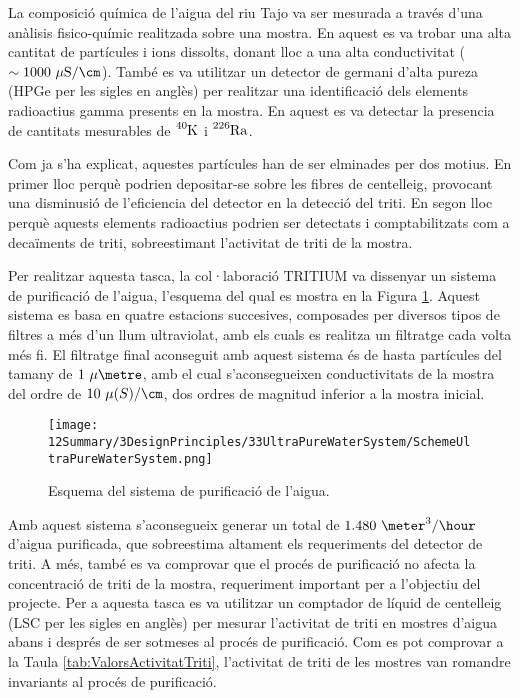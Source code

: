 La composició química de l'aigua del riu Tajo va ser mesurada a través d'una anàlisis fisico-químic realitzada sobre una mostra. En aquest es va trobar una alta cantitat de partícules i ions dissolts, donant lloc a una alta conductivitat ($\sim 1000~\mu\text{S}/\cm$). També es va utilitzar un detector de germani d'alta pureza (HPGe per les sigles en anglès) per realitzar una identificació dels elements radioactius gamma presents en la mostra. En aquest es va detectar la presencia de cantitats mesurables de $\ce{^{40}K}$ i $\ce{^{226}Ra}$.

Com ja s'ha explicat, aquestes partícules han de ser elminades per dos motius. En primer lloc perquè podrien depositar-se sobre les fibres de centelleig, provocant una disminusió de l'eficiencia del detector en la detecció del triti. En segon lloc perquè aquests elements radioactius podrien ser detectats i comptabilitzats com a decaïments de triti, sobreestimant l'activitat de triti de la mostra.

Per realitzar aquesta tasca, la col·laboració TRITIUM va dissenyar un sistema de purificació de l'aigua, l'esquema del qual es mostra en la Figura \ref{fig:EsquemaSistemaAiguaUltrapura}. Aquest sistema es basa en quatre estacions succesives, composades per diversos tipos de filtres a més d'un llum ultraviolat, amb els cuals es realitza un filtratge cada volta més fi. El filtratge final aconseguit amb aquest sistema és de hasta partícules del tamany de $1~\mu\metre$, amb el cual s'aconsegueixen conductivitats de la mostra del ordre de $10~\mu\text(S)/\cm$, dos ordres de magnitud inferior a la mostra inicial.

\begin{figure}[htbp]
\centering
\texttt{[image: 12Summary/3DesignPrinciples/33UltraPureWaterSystem/SchemeUltraPureWaterSystem.png]}
\caption{Esquema del sistema de purificació de l'aigua.\label{fig:EsquemaSistemaAiguaUltrapura}}
\end{figure}

Amb aquest sistema s'aconsegueix generar un total de $1.480~\meter^3/\hour$ d'aigua purificada, que sobreestima altament els requeriments del detector de triti. A més, també es va comprovar que el procés de purificació no afecta la concentració de triti de la mostra, requeriment important per a l'objectiu del projecte. Per a aquesta tasca es va utilitzar un comptador de líquid de centelleig (LSC per les sigles en anglès) per mesurar l'activitat de triti en mostres d'aigua abans i després de ser sotmeses al procés de purificació. Com es pot comprovar a la Taula \ref{tab:ValorsActivitatTriti}, l'activitat de triti de les mostres van romandre invariants al procés de purificació.

